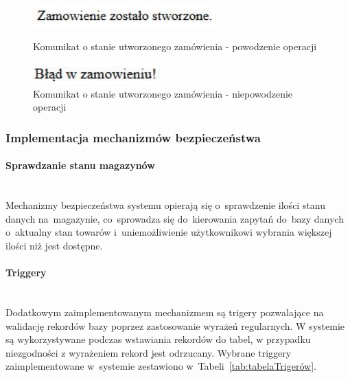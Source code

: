 \documentclass[a4paper, 12pt]{article}
\newcommand{\snippet}[3]{



}
\begin{document}
\snippet{PHP}{zamowienie.php}{Skrypt PHP odpowiadający za stworzenie zamównienia}

\begin{figure}[H]
	\centering
	\includegraphics[width=7cm]{Screeny/ZamowieniePoprawne.JPG}
	\caption[Stan zamówienia - powodzenie operacji]{Komunikat o stanie utworzonego zamówienia - powodzenie operacji}
	\label{fig:stanZamówieniaPowodzenie}

	\includegraphics[width=5cm]{Screeny/ZamowienieNiepoprawne.JPG}
	\caption[Stan zamówienia - niepowodzenie operacji]{Komunikat o stanie utworzonego zamówienia - niepowodzenie operacji}
	\label{fig:stanZamówieniaNiepowodzenie}
\end{figure}

\subsubsection{Implementacja mechanizmów bezpieczeństwa}
\paragraph{Sprawdzanie stanu magazynów} \mbox{}\\
Mechanizmy bezpieczeństwa systemu opierają się o~sprawdzenie ilości stanu danych na~magazynie, co~sprowadza się do~kierowania zapytań do~bazy danych o~aktualny stan towarów i~uniemożliwienie użytkownikowi wybrania większej ilości niż jest dostępne.
\paragraph{Triggery} \mbox{}\\
Dodatkowym zaimplementowanym mechanizmem są trigery pozwalające na walidację rekordów bazy poprzez zastosowanie wyrażeń regularnych. W systemie są wykorzystywane podczas wstawiania rekordów do tabel, w przypadku niezgodności z wyrażeniem rekord jest odrzucany. Wybrane triggery zaimplementowane w~systemie zestawiono w~Tabeli~\ref{tab:tabelaTrigerów}.
\end{document}
